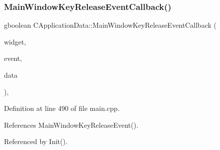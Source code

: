 \hypertarget{classCApplicationData_a4b2c76db5c2efd75404502e36700f99b}{}\label{classCApplicationData_a4b2c76db5c2efd75404502e36700f99b} 
\subsubsection{\texorpdfstring{Main\+Window\+Key\+Release\+Event\+Callback()}{MainWindowKeyReleaseEventCallback()}}
{\footnotesize\ttfamily gboolean C\+Application\+Data\+::\+Main\+Window\+Key\+Release\+Event\+Callback (\begin{DoxyParamCaption}\item[{Gtk\+Widget $\ast$}]{widget,  }\item[{Gdk\+Event\+Key $\ast$}]{event,  }\item[{gpointer}]{data }\end{DoxyParamCaption})\hspace{0.3cm}{\ttfamily [static]}, {\ttfamily [protected]}}



Definition at line 490 of file main.\+cpp.



References Main\+Window\+Key\+Release\+Event().



Referenced by Init().


